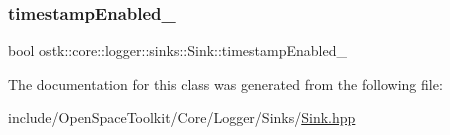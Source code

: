 \mbox{\label{classostk_1_1core_1_1logger_1_1sinks_1_1_sink_ac18e9ae38b09bd049e900c6e7a5b5386}} 
\subsubsection{\texorpdfstring{timestamp\+Enabled\+\_\+}{timestampEnabled\_}}
{\footnotesize\ttfamily bool ostk\+::core\+::logger\+::sinks\+::\+Sink\+::timestamp\+Enabled\+\_\+\hspace{0.3cm}{\ttfamily [protected]}}



The documentation for this class was generated from the following file\+:\begin{DoxyCompactItemize}
\item 
include/\+Open\+Space\+Toolkit/\+Core/\+Logger/\+Sinks/\hyperlink{_sinks_2_sink_8hpp}{Sink.\+hpp}\end{DoxyCompactItemize}

